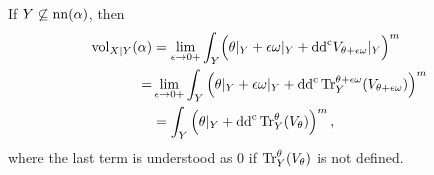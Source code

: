 




\begin{theorem}\label{thm:rest_volume_tr_volume} If $Y\not\subseteq \operatorname{nn}(\alpha)$, then
\begin{equation}\label{eq:non-nef_rest_vol}
\begin{aligned}
\operatorname{vol}_{X|Y}(\alpha) &= \lim_{\epsilon \to 0+}\int_Y \Bigl(\theta|_Y + \epsilon \omega|_Y +  \mathrm{dd}^{\mathrm{c}} V_{\theta+ \epsilon \omega}|_Y\Bigr)^m\\
=&\lim_{\epsilon \to 0+}\int_Y \left(\theta|_Y + \epsilon \omega|_Y +  \mathrm{dd}^{\mathrm{c}} \operatorname{Tr}_Y^{\theta+ \epsilon \omega}(V_{\theta+ \epsilon \omega}) \right)^m \\
&=\int_Y \left( \theta|_Y+\mathrm{dd}^{\mathrm{c}} \operatorname{Tr}_Y^{\theta}(V_{\theta}) \right)^m,
\end{aligned}
\end{equation}
where the last term is understood as $0$ if $\operatorname{Tr}_Y^{\theta}(V_{\theta})$ is not defined.
\end{theorem}

